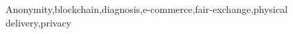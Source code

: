 \documentclass[5p,times]{elsarticle}
\begin{document}
\begin{frontmatter}

\title{\TITLE}






\begin{abstract}
\ABSTRACT{}
\end{abstract}

\begin{keyword}
Anonymity\sep blockchain\sep diagnosis\sep e-commerce\sep fair-exchange\sep physical delivery\sep privacy
\end{keyword}

\end{frontmatter}


\def\JOURNAL{\JOURNALELS}
\newcommand{\printbibliography}{


}
\def\FORMAT{\DOUBLECOLUMN}


\end{document}

